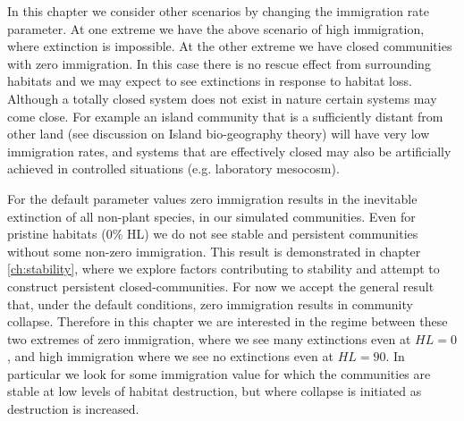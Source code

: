 \begin{itemize}
In this chapter we consider other scenarios by changing the immigration rate parameter. At one extreme we have the above scenario of high immigration, where extinction is impossible. At the other extreme we have closed communities with zero immigration. In this case there is no rescue effect from surrounding habitats and we may expect to see extinctions in response to habitat loss. Although a totally closed system does not exist in nature certain systems may come close. For example an island community that is a sufficiently distant from other land (see discussion on Island bio-geography theory) will have very low immigration rates, and systems that are effectively closed may also be artificially achieved in controlled situations (e.g. laboratory mesocosm).

For the default parameter values zero immigration results in the inevitable extinction of all non-plant species, in our simulated communities. Even for pristine habitats ($0\%$ HL) we do not see stable and persistent communities without some non-zero immigration. This result is demonstrated in chapter \ref{ch:stability}, where we explore factors contributing to stability and attempt to construct persistent closed-communities. For now we accept the general result that, under the default conditions, zero immigration results in community collapse. Therefore in this chapter we are interested in the regime between these two extremes of zero immigration, where we see many extinctions even at $HL=0$, and high immigration where we see no extinctions even at $HL=90$. In particular we look for some immigration value for which the communities are stable at low levels of habitat destruction, but where collapse is initiated as destruction is increased.


\clearpage
\thispagestyle{empty}
\begin{figure}

		\centering      
		\hspace{-3cm}


\end{figure}
\end{itemize}
